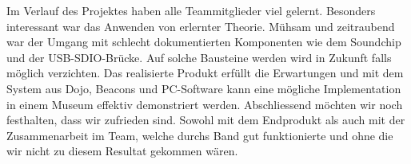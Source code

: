 Im Verlauf des Projektes haben alle Teammitglieder viel gelernt. Besonders interessant war das Anwenden von erlernter Theorie. Mühsam und zeitraubend war der Umgang mit schlecht dokumentierten Komponenten wie dem Soundchip und der USB-SDIO-Brücke. Auf solche Bausteine werden wird in Zukunft falls möglich verzichten. Das realisierte Produkt erfüllt die Erwartungen und mit dem System aus Dojo, Beacons und PC-Software kann eine mögliche Implementation in einem Museum effektiv demonstriert werden. Abschliessend möchten wir noch festhalten, dass wir zufrieden sind. Sowohl mit dem Endprodukt als auch mit der Zusammenarbeit im Team, welche durchs Band gut funktionierte und ohne die wir nicht zu diesem Resultat gekommen wären.


